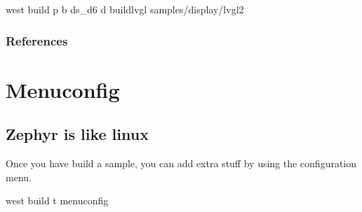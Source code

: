 \documentclass[letterpaper,10pt,english]{sphinxmanual}
\begin{document}
west build \sphinxhyphen{}p \sphinxhyphen{}b ds\_d6 \sphinxhyphen{}d build\sphinxhyphen{}lvgl samples/display/lvgl2


\subsection{References}
\label{\detokenize{samples/lvgl2/README:references}}

\chapter{Menuconfig}
\label{\detokenize{menuconfig:menuconfig}}\label{\detokenize{menuconfig::doc}}

\section{Zephyr is like linux}
\label{\detokenize{menuconfig:zephyr-is-like-linux}}
Once you have build a sample, you can add extra stuff by using the configuration menu.

\begin{sphinxVerbatim}[commandchars=\\\{\}]
 west build \PYGZhy{}t menuconfig
\end{sphinxVerbatim}
\end{document}
